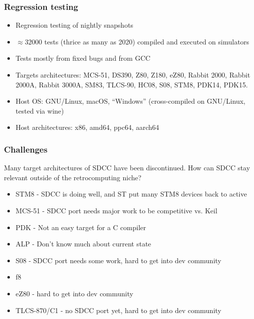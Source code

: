\documentclass[xcolor=dvipsnames]{beamer}
\begin{document}
\begin{frame}
	\frametitle{Regression testing}
	\begin{itemize}
		\item Regression testing of nightly snapshots
		\item $\approx 32000$ tests (thrice as many as 2020) compiled and executed on simulators
		\item Tests mostly from fixed bugs and from GCC
		\item Targets architectures: MCS-51, DS390, Z80, Z180, eZ80, Rabbit 2000, Rabbit 2000A, Rabbit 3000A, SM83, TLCS-90, HC08, S08, STM8, PDK14, PDK15. 
		\item Host OS: GNU/Linux, macOS, ``Windows'' (cross-compiled on GNU/Linux, tested via wine)
		\item Host architectures: x86, amd64, ppc64, aarch64
	\end{itemize}
\end{frame}

\begin{frame}
	\frametitle{Challenges}
	Many target architectures of SDCC have been discontinued. How can SDCC stay relevant outside of the retrocomputing niche?
	\begin{itemize}
		\item STM8 - SDCC is doing well, and ST put many STM8 devices back to active
		\item MCS-51 - SDCC port needs major work to be competitive vs. Keil
		\item PDK - Not an easy target for a C compiler
		\item ALP - Don't know much about current state
		\item S08 - SDCC port needs some work, hard to get into dev community
		\item f8
		\item eZ80 - hard to get into dev community
		\item TLCS-870/C1 - no SDCC port yet, hard to get into dev community
	\end{itemize}
\end{frame}
\end{document}
